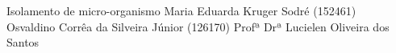 \documentclass[12pt]{article}
\begin{document}
\capa
    {Isolamento de micro-organismo}
    {Maria Eduarda Kruger Sodré (152461) \\ Osvaldino Corrêa da Silveira Júnior (126170)}
    {Profª Drª Lucielen Oliveira dos Santos}

\pagestyle{empty}
{
  \renewcommand{\contentsname}{\hfill\bfseries Sumário\hfill}
  \tableofcontents
}
\newpage
\pagestyle{fancy}








\end{document}
